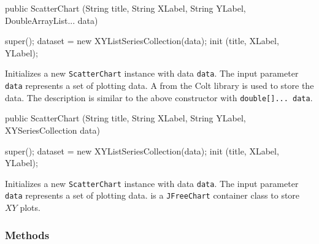 \begin{code}

   public ScatterChart (String title, String XLabel, String YLabel,
                        DoubleArrayList... data) \begin{hide} {
      super();
      dataset = new XYListSeriesCollection(data);
      init (title, XLabel, YLabel);
   }\end{hide}
\end{code}
\begin{tabb}
   Initializes a new \texttt{ScatterChart} instance with data \texttt{data}.
   The input parameter \texttt{data} represents a set of plotting data. A
    from the Colt library is
   used to store the data. The description is similar to the above
   constructor with \texttt{double[]... data}.
\end{tabb}
\begin{htmlonly}
\end{htmlonly}
\begin{code}

   public ScatterChart (String title, String XLabel, String YLabel,
                        XYSeriesCollection data) \begin{hide} {
      super();
      dataset = new XYListSeriesCollection(data);
      init (title, XLabel, YLabel);
   }\end{hide}
\end{code}
\begin{tabb}
   Initializes a new \texttt{ScatterChart} instance with data \texttt{data}.
   The input parameter \texttt{data} represents a set of plotting data.
    is a
   \texttt{JFreeChart} container class to store $XY$ plots.
\end{tabb}
\begin{htmlonly}
\end{htmlonly}

\subsubsection*{Methods}

